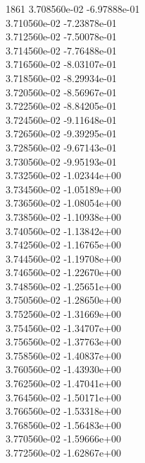1861	3.708560e-02	-6.97888e-01	\\ 	3.710560e-02	-7.23878e-01	\\ 	3.712560e-02	-7.50078e-01	\\ 	3.714560e-02	-7.76488e-01	\\ 	3.716560e-02	-8.03107e-01	\\ 	3.718560e-02	-8.29934e-01	\\ 	3.720560e-02	-8.56967e-01	\\ 	3.722560e-02	-8.84205e-01	\\ 	3.724560e-02	-9.11648e-01	\\ 	3.726560e-02	-9.39295e-01	\\ 	3.728560e-02	-9.67143e-01	\\ 	3.730560e-02	-9.95193e-01	\\ 	3.732560e-02	-1.02344e+00	\\ 	3.734560e-02	-1.05189e+00	\\ 	3.736560e-02	-1.08054e+00	\\ 	3.738560e-02	-1.10938e+00	\\ 	3.740560e-02	-1.13842e+00	\\ 	3.742560e-02	-1.16765e+00	\\ 	3.744560e-02	-1.19708e+00	\\ 	3.746560e-02	-1.22670e+00	\\ 	3.748560e-02	-1.25651e+00	\\ 	3.750560e-02	-1.28650e+00	\\ 	3.752560e-02	-1.31669e+00	\\ 	3.754560e-02	-1.34707e+00	\\ 	3.756560e-02	-1.37763e+00	\\ 	3.758560e-02	-1.40837e+00	\\ 	3.760560e-02	-1.43930e+00	\\ 	3.762560e-02	-1.47041e+00	\\ 	3.764560e-02	-1.50171e+00	\\ 	3.766560e-02	-1.53318e+00	\\ 	3.768560e-02	-1.56483e+00	\\ 	3.770560e-02	-1.59666e+00	\\ 	3.772560e-02	-1.62867e+00	\\ \hline
